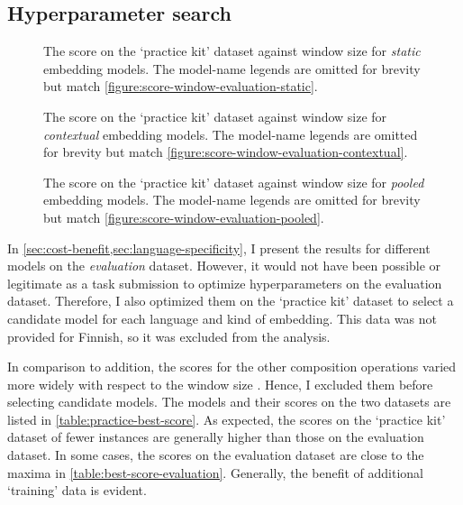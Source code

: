 \subsection{Hyperparameter search}
\label{sec:hyperparameter-search}



\begin{figure}
  \centering
  
  \caption{The score on the `practice kit' dataset against window size for \emph{static}
    embedding models.
    The model-name legends are omitted for brevity but match
    \cref{figure:score-window-evaluation-static}.
  }
  \label{figure:score-window-practice-static}
\end{figure}

\begin{figure}
  \centering
  
  \caption{The score on the `practice kit' dataset against window size for
    \emph{contextual} embedding models.
    The model-name legends are omitted for brevity but match
    \cref{figure:score-window-evaluation-contextual}.
  }
  \label{figure:score-window-practice-contextual}
\end{figure}

\begin{figure}
  \centering
  
  \caption{The score on the `practice kit' dataset against window size for \emph{pooled}
    embedding models.
    The model-name legends are omitted for brevity but match
    \cref{figure:score-window-evaluation-pooled}.
  }
  \label{figure:score-window-practice-pooled}
\end{figure}

In \cref{sec:cost-benefit,sec:language-specificity}, I present the results for
different models on the \emph{evaluation} dataset.
However, it would not have been possible or legitimate as a task submission to optimize
hyperparameters on the evaluation dataset.
Therefore, I also optimized them on the `practice kit' dataset
 to select a candidate model for each language and kind
of embedding.
This data was not provided for Finnish, so it was excluded from the analysis.

In comparison to addition, the scores for the other composition operations varied more
widely with respect to the window size
.
Hence, I excluded them before selecting candidate models.
The models and their scores on the two datasets are listed in
\cref{table:practice-best-score}.
As expected, the scores on the `practice kit' dataset of fewer instances are generally
higher than those on the evaluation dataset.
In some cases, the scores on the evaluation dataset are close to the maxima in
\cref{table:best-score-evaluation}.
Generally, the benefit of additional `training' data is evident.

